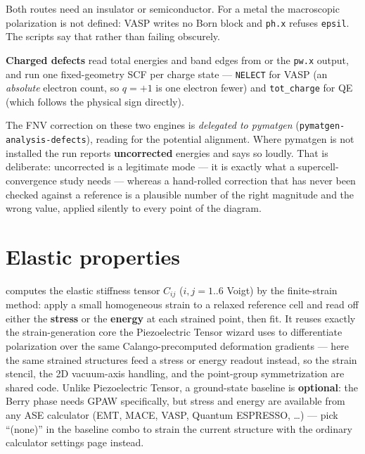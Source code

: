 \begin{calnote}
Both routes need an insulator or semiconductor. For a metal the macroscopic
polarization is not defined: VASP writes no Born block and \texttt{ph.x}
refuses \texttt{epsil}. The scripts say that rather than failing obscurely.
\end{calnote}

\textbf{Charged defects} read total energies and band edges from
 or the \texttt{pw.x} output, and run one fixed-geometry SCF
per charge state --- \texttt{NELECT} for VASP (an \emph{absolute} electron
count, so $q = +1$ is one electron fewer) and \texttt{tot\_charge} for QE
(which follows the physical sign directly).

\begin{calwarn}
The FNV correction on these two engines is \emph{delegated to pymatgen}
(\texttt{pymatgen-analysis-defects}), reading  for the potential
alignment. Where pymatgen is not installed the run reports \textbf{uncorrected}
energies and says so loudly. That is deliberate: uncorrected is a legitimate
mode --- it is exactly what a supercell-convergence study needs --- whereas a
hand-rolled correction that has never been checked against a reference is a
plausible number of the right magnitude and the wrong value, applied silently
to every point of the diagram.
\end{calwarn}

\section{Elastic properties}
\label{sec:elastic}

\menusep{} computes the
elastic stiffness tensor $C_{ij}$ ($i,j = 1..6$ Voigt) by the finite-strain
method: apply a small homogeneous strain to a relaxed reference cell and
read off either the \textbf{stress} or the \textbf{energy} at each strained
point, then fit. It reuses exactly the strain-generation core the
Piezoelectric Tensor wizard uses to differentiate polarization over the
same Calango-precomputed deformation gradients --- here the same strained
structures feed a stress or energy readout instead, so the strain stencil,
the 2D vacuum-axis handling, and the point-group symmetrization are shared
code. Unlike Piezoelectric Tensor, a ground-state baseline is
\textbf{optional}: the Berry phase needs GPAW specifically, but stress and
energy are available from any ASE calculator (EMT, MACE, VASP, Quantum
ESPRESSO, \ldots) --- pick ``(none)'' in the baseline combo to strain the
current structure with the ordinary calculator settings page instead.

